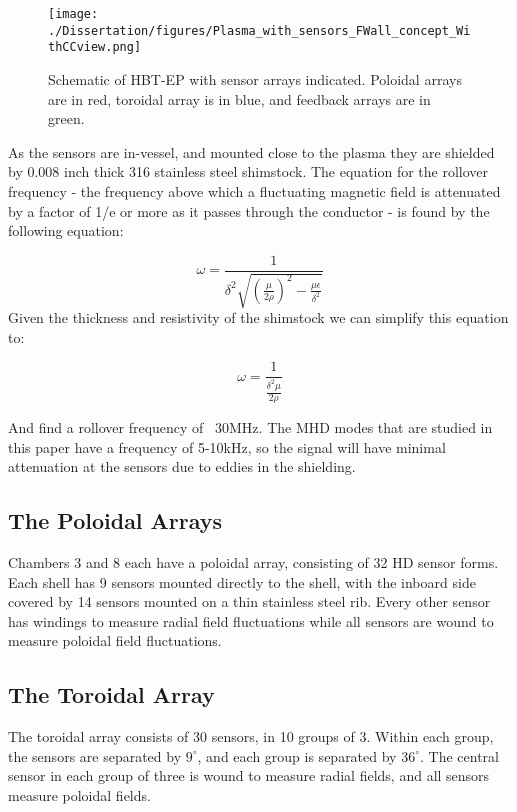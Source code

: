 \begin{figure}
\texttt{[image: ./Dissertation/figures/Plasma\_with\_sensors\_FWall\_concept\_WithCCview.png]}\begin{flushleft}
\caption{Schematic of HBT-EP with sensor arrays indicated.  Poloidal arrays are in red, toroidal array is in blue, and feedback arrays are in green.}
\end{flushleft}
\label{PA_sensors}
\end{figure}

As the sensors are in-vessel, and mounted close to the plasma they are shielded by 0.008 inch thick 316 stainless steel shimstock.  The equation for the rollover frequency - the frequency above which a fluctuating magnetic field is attenuated by a factor of 1/e or more as it passes through the conductor - is found by the following equation:

\begin{equation}
\omega = \frac{1}{\delta^2 \sqrt{(\frac{\mu}{2\rho})^2-\frac{\mu\epsilon}{\delta^2}}}
\end{equation}
Given the thickness and resistivity of the shimstock we can simplify this equation to:

\begin{equation}
\omega = \frac{1}{\frac{\delta^2\mu}{2\rho}}
\end{equation}

And find a rollover frequency of ~30MHz.  The MHD modes that are studied in this  paper have a frequency of 5-10kHz, so the signal will have minimal attenuation at the sensors due to eddies in the shielding.

\subsection{The Poloidal Arrays}
Chambers 3 and 8 each have a poloidal array, consisting of 32 HD sensor forms.  Each shell has 9 sensors mounted directly to the shell, with the inboard side covered by 14 sensors mounted on a thin stainless steel rib.  Every other sensor has windings to measure radial field fluctuations while all sensors are wound to measure poloidal field fluctuations.

\subsection{The Toroidal Array}
The toroidal array consists of 30 sensors, in 10 groups of 3.  Within each group, the sensors are separated by $9^{\circ}$, and each group is separated by $36^{\circ}$.  The central sensor in each group of three is wound to measure radial fields, and all sensors measure poloidal fields.  

